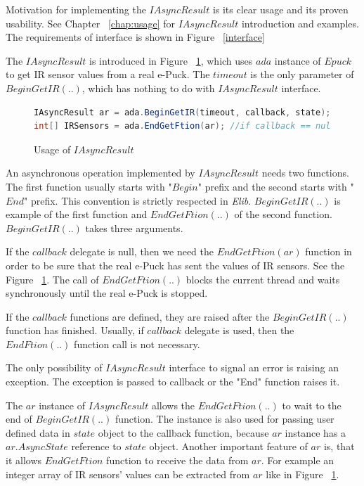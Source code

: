   Motivation for implementing the $IAsyncResult$ is its clear usage and its proven usability.
  See Chapter ~\ref{chap:usage} for $IAsyncResult$ introduction and examples.
  The requirements of interface is shown in Figure ~\ref{interface}

  The $IAsyncResult$ is introduced in Figure ~\ref{arexample}, which uses $ada$ instance
  of $Epuck$ to get IR sensor values from a real e-Puck. The $timeout$ is the only parameter of $BeginGetIR(..)$,
  which has nothing to do with $IAsyncResult$ interface.

\begin{figure}[!hbp]
\begin{lstlisting}[language=cs]
IAsyncResult ar = ada.BeginGetIR(timeout, callback, state);            
int[] IRSensors = ada.EndGetFtion(ar); //if callback == null
\end{lstlisting}
\caption{Usage of $IAsyncResult$}\label{arexample}
\end{figure}

  An asynchronous operation implemented by $IAsyncResult$ needs two functions. The first function usually starts with 
  "$Begin$" prefix and the second starts with "$End$" prefix. This convention is strictly respected in {\it Elib}.
  $BeginGetIR(..)$ is example of the first function and $EndGetFtion(..)$ of the second function.
  $BeginGetIR(..)$ takes three arguments. 

  If the $callback$ delegate is null, then we need the $EndGetFtion(ar)$ function
  in order to be sure that the real e-Puck has sent the values of IR sensors. 
  See the Figure ~\ref{arexample}.
  The call of $EndGetFtion(..)$ blocks the current thread and waits synchronously until the real
  e-Puck is stopped.

  If the $callback$ functions are defined, they are raised after the $BeginGetIR(..)$ function has finished.
  Usually, if $callback$ delegate is used, then the $EndFtion(..)$ function call is not necessary.

  The only possibility of $IAsyncResult$ interface to signal an error is raising an exception.
  The exception is passed to callback or the "End" function raises it.

  The $ar$ instance of $IAsyncResult$ allows the $EndGetFtion(..)$ to wait to the end of $BeginGetIR(..)$ function.
  The instance is also used for passing user defined data in $state$ object to the callback function,
  because $ar$ instance has a $ar.AsyncState$ reference to $state$ object.
  Another important feature of $ar$ is, that it allows $EndGetFtion$ function to receive the data
  from $ar$. For example an integer array of IR sensors' values can be extracted from $ar$ like in Figure ~\ref{arexample}.
  
